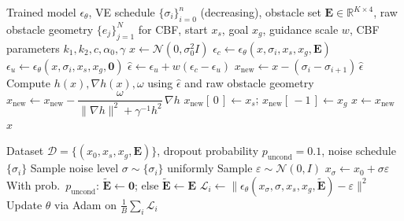 \documentclass{article}
\newcommand{\R}{\mathbb{R}}
\begin{document}
\begin{algorithm}[H]
\caption{CFG DPM-Solver-1 + CBF Sampling}
\begin{algorithmic}[1]
\Require Trained model $\epsilon_\theta$, VE schedule $\{\sigma_i\}_{i=0}^{n}$
         (decreasing), obstacle set $\mathbf{E} \in \R^{K\times4}$,
         raw obstacle geometry $\{e_j\}_{j=1}^N$ for CBF,
         start $x_s$, goal $x_g$, guidance scale $w$,
         CBF parameters $k_1, k_2, c, \alpha_0, \gamma$
\State $x \leftarrow \mathcal{N}(0, \sigma_0^2 I)$ 
    \State $\epsilon_c \leftarrow \epsilon_\theta(x, \sigma_i, x_s, x_g, \mathbf{E})$
    \State $\epsilon_u \leftarrow \epsilon_\theta(x, \sigma_i, x_s, x_g, \mathbf{0})$
    \State $\hat\epsilon \leftarrow \epsilon_u + w(\epsilon_c - \epsilon_u)$
    \State $x_{\mathrm{new}} \leftarrow x - (\sigma_i - \sigma_{i+1})\,\hat\epsilon$
    \State Compute $h(x), \nabla h(x), \omega$
           using $\hat\epsilon$ and raw obstacle geometry
        \State $x_{\mathrm{new}} \leftarrow x_{\mathrm{new}}
                - \dfrac{\omega}{\|\nabla h\|^2 + \gamma^{-1}h^2}\,\nabla h$
    \EndIf
    \State $x_{\mathrm{new}}[\,0\,] \leftarrow x_s$;\;
           $x_{\mathrm{new}}[\,-1\,] \leftarrow x_g$
    \State $x \leftarrow x_{\mathrm{new}}$
\EndFor
\State \Return $x$
\end{algorithmic}
\end{algorithm}

\begin{algorithm}[H]
\caption{CFG Training with Obstacle Dropout}
\begin{algorithmic}[1]
\Require Dataset $\mathcal{D} = \{(x_0, x_s, x_g, \mathbf{E})\}$,
         dropout probability $p_{\mathrm{uncond}} = 0.1$,
         noise schedule $\{\sigma_i\}$
        \State Sample noise level $\sigma \sim \{\sigma_i\}$ uniformly
        \State Sample $\varepsilon \sim \mathcal{N}(0, I)$
        \State $x_\sigma \leftarrow x_0 + \sigma\varepsilon$
        \State With prob.\ $p_{\mathrm{uncond}}$: $\tilde{\mathbf{E}} \leftarrow \mathbf{0}$;
               else $\tilde{\mathbf{E}} \leftarrow \mathbf{E}$
        \State $\mathcal{L}_i \leftarrow \|\epsilon_\theta(x_\sigma, \sigma, x_s, x_g, \tilde{\mathbf{E}}) - \varepsilon\|^2$
    \EndFor
    \State Update $\theta$ via Adam on $\frac{1}{B}\sum_i \mathcal{L}_i$
\EndFor
\end{algorithmic}
\end{algorithm}
\end{document}
